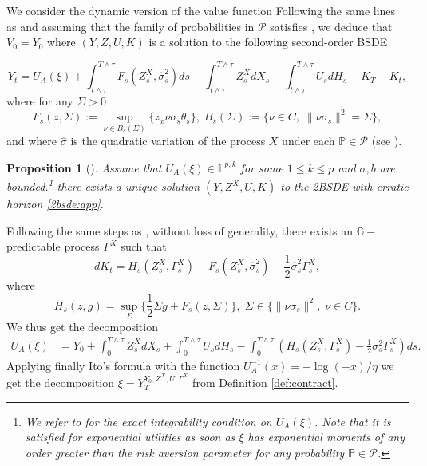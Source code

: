 \documentclass[11pt,a4paper]{article}
\theoremstyle{thmstyleone}%
\newtheorem{proposition}[theorem]{Proposition}%
\theoremstyle{thmstyletwo}%
\theoremstyle{thmstylethree}%
\begin{document}
We consider the dynamic version of the value function
Following the same lines as \cite[Proof of Theorem 4.2]{cvitanic2017moral} and assuming that the family of probabilities in $\mathcal P$ satisfies \cite[2.1.3. Conditioning and concatenation of probability measures and Assumption 2.1 (iii)-(iv)-(v)]{possamai2018stochastic}, we deduce that $V_0=Y_0$ where $(Y,Z,U,K)$ is a solution to the following second-order BSDE

\begin{equation}
\label{2bsde:app}Y_t=U_A(\xi)+\int_{t\wedge \tau}^{T\wedge \tau} F_s(Z^X_s,\hat\sigma^2_s)ds-\int_{t\wedge \tau}^{T\wedge \tau} Z^X_s dX_s -\int_{t\wedge \tau}^{T\wedge \tau} U_s dH_s+K_T-K_t ,\end{equation}
where for any $\Sigma>0$ 
\[F_s(z,\Sigma):=\sup_{\nu\in B_s(\Sigma)} \{z_x\nu \sigma_s \theta_s\}, \; B_s(\Sigma):=\{\nu\in  C,\; \|\nu\sigma_s\|^2=\Sigma\},\]
and where $\hat\sigma$ is the quadratic variation of the process $X$ under each $\mathbb P\in \mathcal P$ (see \cite{karandikar1995pathwise,cvitanic2018dynamic}). 
\begin{proposition}[\cite{gennaro20252bsde}]
   Assume that $U_A(\xi)\in \mathbb L^{p,k}$ for some $1\leq k\leq p$ and $\sigma,b$ are bounded.\footnote{We refer to \cite[Section 2.3]{gennaro20252bsde} for the exact integrability condition on $U_A(\xi)$. Note that it is satisfied for exponential utilities as soon as $\xi$ has exponential moments of any order greater than the risk aversion parameter for any probability $\mathbb P\in \mathcal P$. } there exists a unique solution $(Y,Z^X,U,K)$ to the 2BSDE with erratic horizon \eqref{2bsde:app}. 
\end{proposition}

Following the same steps as \cite[section 5.4]{cvitanic2018dynamic}, without loss of generality, there exists an $\mathbb G-$predictable process $\Gamma^X$ such that 
\[dK_t=H_s(Z^X_s,\Gamma^X_s)-F_s(Z^X_s,\hat\sigma^2_s) -\frac12\hat\sigma^2_s\Gamma^X_s,\]
where
\[H_s(z,g)=\sup_\Sigma\{\frac12\Sigma g+F_s(z,\Sigma)\},\; \Sigma\in \{\|\nu\sigma_s\|^2,\; \nu\in C\}.\] We thus get the decomposition
\begin{align*}
U_A(\xi)&= Y_0+\int_{0}^{T\wedge \tau} Z_s^X dX_s + \int_{0}^{T\wedge \tau} U_s dH_s-\int_0^{T\wedge \tau} (H_s(Z_s^X,\Gamma_s^X)-\frac12 \sigma_s^2\Gamma_s^X)ds.
\end{align*}
Applying finally Ito's formula with the function $U_A^{-1}(x)=-\log(-x)/\eta$ we get the decomposition $\xi=Y_T^{Y_0,Z^X,U,\Gamma^X}$ from Definition \ref{def:contract}.
\end{document}
